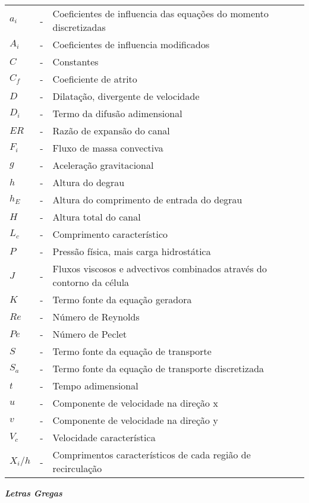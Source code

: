 \noindent
\begin{tabular}{l c p{.8\linewidth} c}
	$a_i$ & - & Coeficientes de influencia das equações do momento discretizadas\\
	$A_i$ & - & Coeficientes de influencia modificados \\
	$C$ & - & Constantes \\
	$C_f$ & - & Coeficiente de atrito \\
	$D$ & - & Dilatação, divergente de velocidade \\
	$D_i$ & - & Termo da difusão adimensional\\
	$ER$ & - & Razão de expansão do canal\\
	$F_i$ & - & Fluxo de massa convectiva\\
	$g$ & - & Aceleração gravitacional \\
	$h$ & - & Altura do degrau \\
	$h_E$ & - & Altura do comprimento de entrada do degrau \\
	$H$ & - & Altura total do canal \\
	$L_c$ & - & Comprimento característico\\
	$P$ & - & Pressão física, mais carga hidrostática\\
	$J$ & - & Fluxos viscosos e advectivos combinados através do contorno da célula\\
	$K$ & - & Termo fonte da equação geradora\\
	$Re$ & - & Número de Reynolds\\
	$Pe$ & - & Número de Peclet\\
	$S$ & - & Termo fonte da equação de transporte\\
	$S_a$ & - & Termo fonte da equação de transporte discretizada\\
	$t$ & - & Tempo adimensional\\
	$u$ & - & Componente de velocidade na direção x\\
	$v$ & - & Componente de velocidade na direção y\\
	$V_c$ & - & Velocidade característica\\
	$X_i/h$ & - & Comprimentos característicos de cada região de recirculação\\
\end{tabular}
\newline \newline
\textbf{\emph{Letras Gregas}}\\

